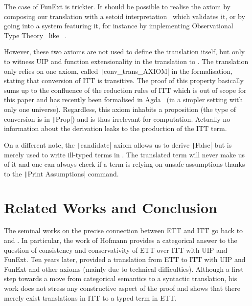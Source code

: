 The case of FunExt is trickier. It should be possible to realise
the axiom by composing our translation with a setoid
interpretation~\cite{altenkirch99} which validates it, or by going into a
system featuring it, for instance by implementing Observational Type
Theory~\cite{altenkirch2007observational} like
\Epigram~\cite{mcbride2004epigram}.

However, these two axioms are not used to define the translation itself,
but only to witness UIP and function extensionality in the translation to
\Coq.
The translation only relies on one axiom, called
\texttt|conv_trans_AXIOM| in the formalisation, stating that conversion
of ITT is transitive.
%
The proof of this property basically sums up to the confluence of the
reduction rules of ITT which is out of scope for this paper and has
recently been formalised in Agda~\cite{Abel:2017:DCT:3177123.3158111} (in a
simpler setting with only one universe).
Regardless, this axiom inhabits a proposition (the type of conversion is in
\texttt|Prop|) and is thus irrelevant for computation. Actually no
information about the derivation leaks to the production of the ITT term.

On a different note, the \texttt|candidate| axiom allows us to derive
\texttt|False| but is merely used to write ill-typed terms in \Coq.
The translated term will never make us of it and one can always check if a
term is relying on unsafe assumptions thanks to the
\texttt|Print Assumptions| command.

\section{Related Works and Conclusion}
\label{sec:related-works}

The seminal works on the precise connection between ETT and ITT go
back to \cite{streicher1993investigations} and
\cite{hofmann1995conservativity,HofmannPhD}.
%
In particular, the work of Hofmann provides a categorical answer to
the question of consistency and conservativity of ETT over ITT with
UIP and FunExt.
%
Ten years later, \cite{oury2005extensionality,Oury2006} provided
a translation from ETT to ITT with
UIP and FunExt and other axioms (mainly due to
technical difficulties).
%
Although a first step towards a move from categorical semantics to a
syntactic translation, his work does not stress any constructive
aspect of the proof and shows that there merely exist translations in
ITT to a typed term in ETT.

